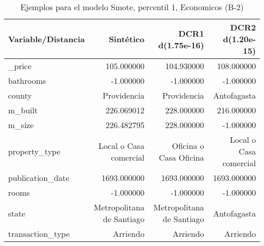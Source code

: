 \begin{table}[H]
\centering
\fontsize{10}{14}\selectfont
\caption{Ejemplos para el modelo Smote, percentil 1, Economicos (B-2)}
\label{table-example-economicos-b-2-smote-enc-1p}
\begin{tabular}{|l|r|r|r|}
\hline
\rowcolor[gray]{0.8}
Variable/Distancia & Sintético & DCR1 d(1.75e-16) & DCR2 d(1.20e-15) \\
\hline \_price & \cellcolor[rgb]{0.9, 0.54, 0.52} 105.000000 & 104.930000 & 108.000000 \\
\hline bathrooms & \cellcolor[rgb]{0.9, 0.54, 0.52} -1.000000 & \cellcolor[rgb]{0.9, 0.54, 0.52} -1.000000 & \cellcolor[rgb]{0.9, 0.54, 0.52} -1.000000 \\
\hline county & \cellcolor[rgb]{0.9, 0.54, 0.52} Providencia & \cellcolor[rgb]{0.9, 0.54, 0.52} Providencia & Antofagasta \\
\hline m\_built & \cellcolor[rgb]{0.9, 0.54, 0.52} 226.069012 & 228.000000 & 216.000000 \\
\hline m\_size & \cellcolor[rgb]{0.9, 0.54, 0.52} 226.482795 & 228.000000 & -1.000000 \\
\hline property\_type & \cellcolor[rgb]{0.9, 0.54, 0.52} Local o Casa comercial & Oficina o Casa Oficina & \cellcolor[rgb]{0.9, 0.54, 0.52} Local o Casa comercial \\
\hline publication\_date & \cellcolor[rgb]{0.9, 0.54, 0.52} 1693.000000 & \cellcolor[rgb]{0.9, 0.54, 0.52} 1693.000000 & \cellcolor[rgb]{0.9, 0.54, 0.52} 1693.000000 \\
\hline rooms & \cellcolor[rgb]{0.9, 0.54, 0.52} -1.000000 & \cellcolor[rgb]{0.9, 0.54, 0.52} -1.000000 & \cellcolor[rgb]{0.9, 0.54, 0.52} -1.000000 \\
\hline state & \cellcolor[rgb]{0.9, 0.54, 0.52} Metropolitana de Santiago & \cellcolor[rgb]{0.9, 0.54, 0.52} Metropolitana de Santiago & Antofagasta \\
\hline transaction\_type & \cellcolor[rgb]{0.9, 0.54, 0.52} Arriendo & \cellcolor[rgb]{0.9, 0.54, 0.52} Arriendo & \cellcolor[rgb]{0.9, 0.54, 0.52} Arriendo \\
\hline
\end{tabular}
\end{table}
